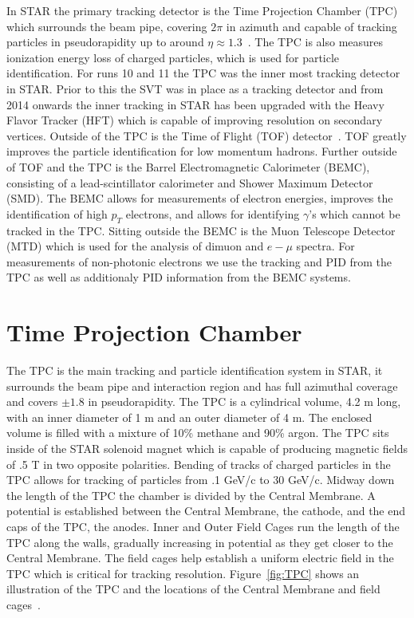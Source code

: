 In STAR the primary tracking detector is the Time Projection Chamber (TPC) which surrounds the beam pipe, covering $2\pi$ in azimuth and capable of tracking particles in pseudorapidity up to around $\eta \approx 1.3$~\cite{tpcNIM}. The TPC is also measures ionization energy loss of charged particles, which is used for particle identification. For runs 10 and 11 the TPC was the inner most tracking detector in STAR. Prior to this the SVT was in place as a tracking detector and from 2014 onwards the inner tracking in STAR has been upgraded with the Heavy Flavor Tracker (HFT) which is capable of improving resolution on secondary vertices. Outside of the TPC is the Time of Flight (TOF) detector~\cite{vpdNIM}. TOF greatly improves the particle identification for low momentum hadrons. Further outside of TOF and the TPC is the Barrel Electromagnetic Calorimeter (BEMC), consisting of a lead-scintillator calorimeter and Shower Maximum Detector (SMD). The BEMC allows for measurements of electron energies, improves the identification of high $p_T$ electrons, and allows for identifying $\gamma$'s which cannot be tracked in the TPC. Sitting outside the BEMC is the Muon Telescope Detector (MTD) which is used for the analysis of dimuon and $e-\mu$ spectra. For measurements of non-photonic electrons we use the tracking and PID from the TPC as well as additionaly PID information from the BEMC systems.

\section{Time Projection Chamber}

The TPC is the main tracking and particle identification system in STAR, it surrounds the beam pipe and interaction region and has full azimuthal coverage and covers $\pm 1.8$ in pseudorapidity. The TPC is a cylindrical volume, 4.2 m long, with an inner diameter of 1 m and an outer diameter of 4 m. The enclosed volume is filled with a mixture of 10\% methane and 90\% argon. The TPC sits inside of the STAR solenoid magnet which is capable of producing magnetic fields of .5 T in two opposite polarities. Bending of tracks of charged particles in the TPC allows for tracking of particles from .1 GeV/c to 30 GeV/c. Midway down the length of the TPC the chamber is divided by the Central Membrane. A potential is established between the Central Membrane, the cathode, and the end caps of the TPC, the anodes. Inner and Outer Field Cages run the length of the TPC along the walls, gradually increasing in potential as they get closer to the Central Membrane. The field cages help establish a uniform electric field in the TPC which is critical for tracking resolution. Figure~\ref{fig:TPC} shows an illustration of the TPC and the locations of the Central Membrane and field cages~\cite{tpcNIM}.

